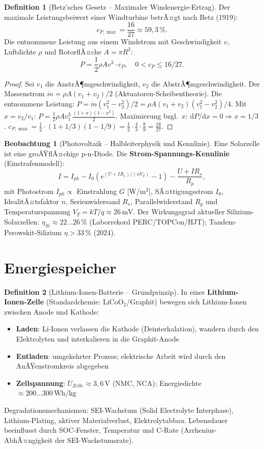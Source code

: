 ﻿\documentclass[a4paper,12pt]{report}
\theoremstyle{definition}
\newtheorem{definition}{Definition}
\newtheorem{beobachtung}{Beobachtung}
\begin{document}
\begin{definition}[Betz'sches Gesetz -- Maximaler Windenergie-Ertrag]
Der maximale Leistungsbeiwert einer Windturbine betrÃ¤gt nach Betz (1919):
\[
  c_{P,\max} = \frac{16}{27} \approx 59{,}3\,\%.
\]
Die entnommene Leistung aus einem Windstrom mit Geschwindigkeit $v$,
Luftdichte $\rho$ und RotorflÃ¤che $A = \pi R^2$:
\[
  P = \frac{1}{2}\rho A v^3 \cdot c_P, \quad 0 < c_P \le 16/27.
\]
\end{definition}
\begin{proof}
Sei $v_1$ die AnstrÃ¶mgeschwindigkeit, $v_2$ die AbstrÃ¶mgeschwindigkeit.
Der Massenstrom $\dot{m} = \rho A (v_1+v_2)/2$ (Aktuatoren-Scheibentheorie).
Die entnommene Leistung:
$P = \dot{m}(v_1^2 - v_2^2)/2 = \rho A (v_1+v_2)(v_1^2-v_2^2)/4$.
Mit $x = v_2/v_1$: $P = \frac{1}{2}\rho A v_1^3\,\frac{(1+x)(1-x^2)}{2}$.
Maximierung bzgl.\ $x$: $\mathrm{d}P/\mathrm{d}x = 0 \Rightarrow x = 1/3$.
$c_{P,\max} = \frac{1}{2}\cdot(1+1/3)(1-1/9) = \frac{1}{2}\cdot\frac{4}{3}\cdot\frac{8}{9} = \frac{16}{27}$.
\end{proof}

\begin{beobachtung}[Photovoltaik -- Halbleiterphysik und Kennlinie]
Eine Solarzelle ist eine groÃŸ\-flÃ¤chige p-n-Diode.
Die \textbf{Strom-Spannungs-Kennlinie} (Einstrafenmodell):
\[
  I = I_{ph} - I_0\left(e^{(U + IR_s)/(nV_T)} - 1\right) - \frac{U+IR_s}{R_p},
\]
mit Photostrom $I_{ph} \propto$ Einstrahlung $G$ [W/m$^2$],
SÃ¤ttigungsstrom $I_0$, IdealitÃ¤tsfaktor $n$, Serienwidersand $R_s$,
Parallelwiderstand $R_p$ und Temperaturspannung $V_T = kT/q \approx 26\,\mathrm{mV}$.
Der Wirkungsgrad aktueller Silizium-Solarzellen:
$\eta_{Si} \approx 22\ldots26\,\%$ (Laborrekord PERC/TOPCon/HJT);
Tandem-Perowskit-Silizium $\eta > 33\,\%$ (2024).
\end{beobachtung}

\section{Energiespeicher}

\begin{definition}[Lithium-Ionen-Batterie -- Grundprinzip]
In einer \textbf{Lithium-Ionen-Zelle} (Standardchemie: LiCoO$_2$/Graphit)
bewegen sich Lithium-Ionen zwischen Anode und Kathode:
\begin{itemize}
    \item[-] \textbf{Laden}: Li-Ionen verlassen die Kathode (Deinterkalation),
          wandern durch den Elektrolyten und interkalieren in die Graphit-Anode
    \item[-] \textbf{Entladen}: umgekehrter Prozess; elektrische Arbeit wird
          durch den AuÃŸenstromkreis abgegeben
    \item[-] \textbf{Zellspannung}: $U_{Zelle} \approx 3{,}6\,\mathrm{V}$
          (NMC, NCA); Energiedichte $\approx 200\ldots300\,\mathrm{Wh/kg}$
\end{itemize}
Degradationsmechanismen: SEI-Wachstum (Solid Electrolyte Interphase),
Lithium-Plating, aktiver Materialverlust, Elektrolytabbau.
Lebensdauer beeinflusst durch SOC-Fenster, Temperatur und C-Rate
(Arrhenius-AbhÃ¤ngigkeit der SEI-Wachstumsrate).
\end{definition}
\end{document}
